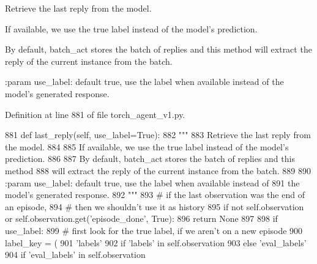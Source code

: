 \begin{DoxyVerb}Retrieve the last reply from the model.

If available, we use the true label instead of the model's prediction.

By default, batch_act stores the batch of replies and this method
will extract the reply of the current instance from the batch.

:param use_label: default true, use the label when available instead of
          the model's generated response.
\end{DoxyVerb}
 

Definition at line 881 of file torch\+\_\+agent\+\_\+v1.\+py.


\begin{DoxyCode}
881     \textcolor{keyword}{def }last\_reply(self, use\_label=True):
882         \textcolor{stringliteral}{"""}
883 \textcolor{stringliteral}{        Retrieve the last reply from the model.}
884 \textcolor{stringliteral}{}
885 \textcolor{stringliteral}{        If available, we use the true label instead of the model's prediction.}
886 \textcolor{stringliteral}{}
887 \textcolor{stringliteral}{        By default, batch\_act stores the batch of replies and this method}
888 \textcolor{stringliteral}{        will extract the reply of the current instance from the batch.}
889 \textcolor{stringliteral}{}
890 \textcolor{stringliteral}{        :param use\_label: default true, use the label when available instead of}
891 \textcolor{stringliteral}{                          the model's generated response.}
892 \textcolor{stringliteral}{        """}
893         \textcolor{comment}{# if the last observation was the end of an episode,}
894         \textcolor{comment}{# then we shouldn't use it as history}
895         \textcolor{keywordflow}{if} \textcolor{keywordflow}{not} self.observation \textcolor{keywordflow}{or} self.observation.get(\textcolor{stringliteral}{'episode\_done'}, \textcolor{keyword}{True}):
896             \textcolor{keywordflow}{return} \textcolor{keywordtype}{None}
897 
898         \textcolor{keywordflow}{if} use\_label:
899             \textcolor{comment}{# first look for the true label, if we aren't on a new episode}
900             label\_key = (
901                 \textcolor{stringliteral}{'labels'}
902                 \textcolor{keywordflow}{if} \textcolor{stringliteral}{'labels'} \textcolor{keywordflow}{in} self.observation
903                 \textcolor{keywordflow}{else} \textcolor{stringliteral}{'eval\_labels'}
904                 \textcolor{keywordflow}{if} \textcolor{stringliteral}{'eval\_labels'} \textcolor{keywordflow}{in} self.observation

\end{DoxyCode}
